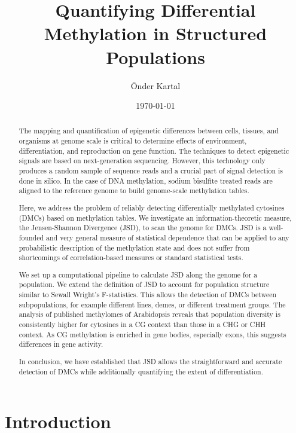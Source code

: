 \documentclass[a4paper]{article}
\title{Quantifying Differential Methylation in Structured Populations}
\author{\"Onder Kartal}
\date{\today}
\begin{document}
\maketitle

\begin{abstract}

  The mapping and quantification of epigenetic differences between
  cells, tissues, and organisms at genome scale is critical to
  determine effects of environment, differentiation, and reproduction
  on gene function.  The techniques to detect epigenetic signals are
  based on next-generation sequencing.  However, this technology only
  produces a random sample of sequence reads and a crucial part of
  signal detection is done in silico.  In the case of DNA methylation,
  sodium bisulfite treated reads are aligned to the reference genome
  to build genome-scale methylation tables.

  Here, we address the problem of reliably detecting differentially
  methylated cytosines (DMCs) based on methylation tables.  We
  investigate an information-theoretic measure, the Jensen-Shannon
  Divergence (JSD), to scan the genome for DMCs.  JSD is a
  well-founded and very general measure of statistical dependence that
  can be applied to any probabilistic description of the methylation
  state and does not suffer from shortcomings of correlation-based
  measures or standard statistical tests.

  We set up a computational pipeline to calculate JSD along the genome
  for a population.  We extend the definition of JSD to account for
  population structure similar to Sewall Wright's F-statistics.  This
  allows the detection of DMCs between subpopulations, for example
  different lines, demes, or different treatment groups.  The analysis
  of published methylomes of Arabidopsis reveals that population
  diversity is consistently higher for cytosines in a CG context than
  those in a CHG or CHH context.  As CG methylation is enriched in
  gene bodies, especially exons, this suggests differences in gene
  activity.

  In conclusion, we have established that JSD allows the
  straightforward and accurate detection of DMCs while additionally
  quantifying the extent of differentiation.

\end{abstract}

\section{Introduction}
\label{sec:introduction}
\end{document}
